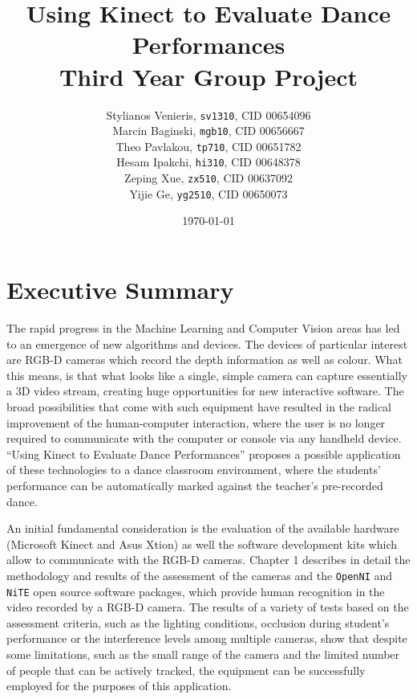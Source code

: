 \documentclass[11pt,a4paper]{article}
\begin{document}
\title{Using Kinect to Evaluate Dance Performances\\ Third Year Group Project}
\author{Stylianos Venieris, \texttt{sv1310}, CID 00654096\\
Marcin Baginski, \texttt{mgb10}, CID 00656667\\
Theo Pavlakou, \texttt{tp710}, CID 00651782\\
Hesam Ipakchi, \texttt{hi310}, CID 00648378\\
Zeping Xue, \texttt{zx510}, CID 00637092\\
Yijie Ge, \texttt{yg2510}, CID 00650073 }
\date{\today}
\maketitle
{}
\newpage


\section*{\center Executive Summary}
The rapid progress in the Machine Learning and Computer Vision areas has led to an emergence of new algorithms and devices. The devices of particular interest are RGB-D cameras which record the depth information as well as colour. What this means, is that what looks like a single, simple camera can capture essentially a 3D video stream, creating huge opportunities for new interactive software. The broad possibilities that come with such equipment have resulted in the radical improvement of the human-computer interaction, where the user is no longer required to communicate with the computer or console via any handheld device. “Using Kinect to Evaluate Dance Performances” proposes a possible application of these technologies to a dance classroom environment, where the students' performance can be automatically marked against the teacher's pre-recorded dance.

\noindent
An initial fundamental consideration is the evaluation of the available hardware (Microsoft Kinect and Asus Xtion) as well the software development kits which allow to communicate with the RGB-D cameras. Chapter 1 describes in detail the methodology and results of the assessment of the cameras and the \texttt{OpenNI} and \texttt{NiTE} open source software packages, which provide human recognition in the video recorded by a RGB-D camera. The results of a variety of tests based on the assessment criteria, such as the lighting conditions, occlusion during student’s performance or the interference levels among multiple cameras, show that despite some limitations, such as the small range of the camera and the limited number of people that can be actively tracked, the equipment can be successfully employed for the purposes of this application.
\end{document}
